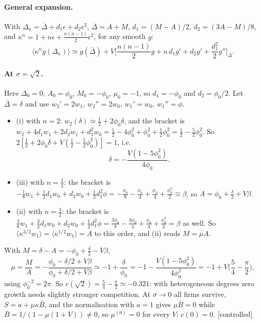 \documentclass[11pt]{article}
\newcommand{\controlled}{\textsf{\small[controlled]}}
\begin{document}
\paragraph{General expansion.}  With $\Delta_\kappa=\bar\Delta+d_1\epsilon+d_2\epsilon^2$, $\bar\Delta=A+M$, $d_1=(M-A)/2$,
$d_2=(3A-M)/8$, and $\kappa^n=1+n\epsilon+\tfrac{n(n-1)}2\epsilon^2$, for any smooth $g$:
\begin{equation}
\langle\kappa^ng(\Delta_\kappa)\rangle\simeq g(\bar\Delta)+V\Big[\frac{n(n-1)}2g+n\,d_1g'+d_2g'+\frac{d_1^2}2g''\Big]_{\bar\Delta}.
\label{eq:genexp}
\end{equation}

\paragraph{At $\sigma=\sqrt2$.}  Here $\Delta_0=0$, $A_0=\phi_0$, $M_0=-\phi_0$, $\mu_0=-1$, so $d_1=-\phi_0$ and $d_2=\phi_0/2$.  Let
$\bar\Delta=\delta$ and use $w_2'=2w_1$, $w_2''=2w_0$, $w_1'=w_0$, $w_1''=\phi$.
\begin{itemize}
\item (i) with $n=2$: $w_2(\delta)\simeq\tfrac12+2\phi_0\delta$, and the bracket is
  $w_2+4d_1w_1+2d_2w_1+d_1^2w_0=\tfrac12-4\phi_0^2+\phi_0^2+\tfrac12\phi_0^2=\tfrac12-\tfrac52\phi_0^2$.  So
  $2[\tfrac12+2\phi_0\delta+V(\tfrac12-\tfrac52\phi_0^2)]=1$, i.e.
  \begin{equation}
  \delta=-\frac{V(1-5\phi_0^2)}{4\phi_0}.
  \end{equation}
\item (iii) with $n=\tfrac12$: the bracket is $-\tfrac18w_1+\tfrac12d_1w_0+d_2w_0+\tfrac12d_1^2\phi=-\tfrac{\phi_0}8-\tfrac{\phi_0}4+\tfrac{\phi_0}4+\tfrac{\phi_0^3}2\equiv\beta$, so
  $A=\phi_0+\tfrac\delta2+V\beta$.
\item (ii) with $n=\tfrac32$: the bracket is $\tfrac38w_1+\tfrac32d_1w_0+d_2w_0+\tfrac12d_1^2\phi=\tfrac{3\phi_0}8-\tfrac{3\phi_0}4+\tfrac{\phi_0}4+\tfrac{\phi_0^3}2=\beta$ as
  well.  So $\langle\kappa^{3/2}w_1\rangle=\langle\kappa^{1/2}w_1\rangle=A$ to this order, and (ii) reads $M=\mu A$.
\end{itemize}
With $M=\delta-A=-\phi_0+\tfrac\delta2-V\beta$,
\begin{equation}
\mu=\frac MA=-\frac{\phi_0-\delta/2+V\beta}{\phi_0+\delta/2+V\beta}\simeq-1+\frac{\delta}{\phi_0}
=-1-\frac{V(1-5\phi_0^2)}{4\phi_0^2}=-1+V\Big(\frac54-\frac\pi2\Big),
\end{equation}
using $\phi_0^{-2}=2\pi$.  So $c(\sqrt2)=\tfrac54-\tfrac\pi2\simeq-0.321$: with heterogeneous degrees zero growth needs slightly
stronger competition.  At $\sigma\to0$ all firms survive, $S=a+\mu\kappa\bar B$, and the normalisation with $a=1$ gives
$\mu\bar B=0$ while $\bar B=1/(1-\mu(1+V))\neq0$, so $\mu^{(0)}=0$ for every $V$: $c(0)=0$.  \controlled
\end{document}
